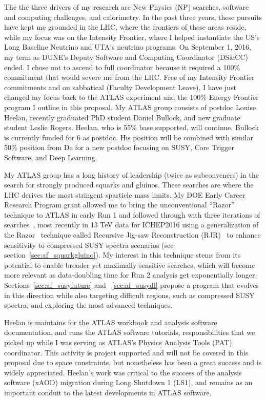 
The the three drivers of my research are New Physics (NP) searches,
software and computing challenges, and calorimetry. In the past three
years, these pursuits have kept me grounded in the LHC, where the
frontiers of these areas reside, while my focus was on the Intensity
Frontier, where I helped instantiate the US's Long Baseline Neutrino
and UTA's neutrino programs. On September 1, 2016, my term as DUNE's
Deputy Software and Computing Coordinator (DS\&CC) ended. I chose not
to ascend to full coordinator because it required a 100\% commitment
that would severe me from the LHC. Free of my Intensity Frontier
commitments and on sabbatical (Faculty Development Leave), I have just
changed my focus back to the ATLAS experiment and the 100\% Energy
Frontier program I outline in this proposal. My ATLAS group consists
of postdoc Louise Heelan, recently graduated PhD student Daniel
Bullock, and new graduate student Leslie Rogers. Heelan, who is 55\%
base supported, will continue. Bullock is currently funded for 6 as
postdoc. His position will be combined with similar 50\% position from
De for a new postdoc focusing on SUSY, Core Trigger Software, and Deep
Learning.

My ATLAS group has a long history of leadership (twice as
subconveners) in the search for strongly produced squarks and
gluinos. These searches are where the LHC derives the most stringent
sparticle mass limits. My DOE Early Career Research Program grant
allowed me to bring the unconventional ``Razor'' technique to ATLAS in
early Run 1 and followed through with three iterations of
searches~\cite{Aad:2012naa,Aad:2015iea,ATLAS-CONF-2016-078}, most
recently in 13 TeV data for ICHEP2016 using a generalization of the
Razor~\cite{Rogan:2010kb} technique called Recursive Jig-saw
Reconstruction (RJR)~\cite{Jackson:2016mfb} to enhance sensitivity to
compressed SUSY spectra scenarios (see
section~\ref{sec:af_squarkgluino}). My interest in this technique
stems from its potential to enable broader yet maximally sensitive
searches, which will become more relevant as data-doubling time for
Run 2 analysis get exponentially longer.
Sections~\ref{sec:af_susyfuture} and ~\ref{sec:af_susydl} propose a
program that evolves in this direction while also targeting difficult
regions, such as compressed SUSY spectra, and exploring the most
advanced techniques.

Heelan is maintains for the ATLAS workbook and analysis software
documentation, and runs the ATLAS software tutorials, responsibilities
that we picked up while I was serving as ATLAS's Physics Analysis
Tools (PAT) coordinator. This activity is project supported and will
not be covered in this proposal due to space constraints, but
nonetheless has been a great success and is widely
appreciated. Heelan's work was critical to the success of the analysis
software (xAOD) migration during Long Shutdown 1 (LS1), and remains as
an important conduit to the latest developments in ATLAS software.

